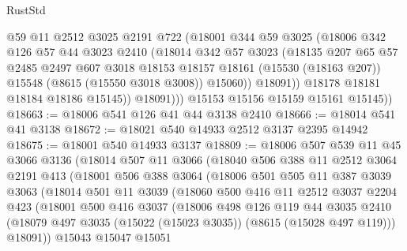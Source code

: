 \begin{lexlean}{RustStd}
\begin{coremodule}
                  @59
                  @11
                  @2512
                  @3025
                  @2191
                  @722
                  (@18001
                    @344
                    @59
                    @3025
                    (@18006
                      @342
                      @126
                      @57
                      @44
                      @3023
                      @2410
                      (@18014
                        @342
                        @57
                        @3023
                        (@18135
                          @207
                          @65
                          @57
                          @2485
                          @2497
                          @607
                          @3018
                          @18153
                          @18157
                          @18161
                          (@15530 (@18163 @207))
                          @15548
                          (@8615 (@15550 @3018 @3008))
                          @15060))
                      @18091))
                  @18178
                  @18181
                  @18184
                  @18186
                  @15145))
              @18091)))
        @15153
        @15156
        @15159
        @15161
        @15145))
@18663 := @18006 @541 @126 @41 @44 @3138 @2410
@18666 := @18014 @541 @41 @3138
@18672 := @18021 @540 @14933 @2512 @3137 @2395 @14942
@18675 := @18001 @540 @14933 @3137
@18809 := @18006
    @507
    @539
    @11
    @45
    @3066
    @3136
    (@18014
      @507
      @11
      @3066
      (@18040
        @506
        @388
        @11
        @2512
        @3064
        @2191
        @413
        (@18001
          @506
          @388
          @3064
          (@18006
            @501
            @505
            @11
            @387
            @3039
            @3063
            (@18014
              @501
              @11
              @3039
              (@18060
                @500
                @416
                @11
                @2512
                @3037
                @2204
                @423
                (@18001
                  @500
                  @416
                  @3037
                  (@18006
                    @498
                    @126
                    @119
                    @44
                    @3035
                    @2410
                    (@18079 @497 @3035 (@15022 (@15023 @3035)) (@8615 (@15028 @497 @119)))
                    @18091))
                @15043
                @15047
                @15051

\end{coremodule}
\end{lexlean}
